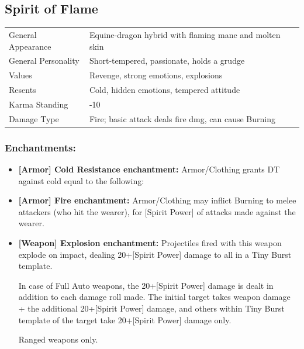 \documentclass[11pt,a4paper,twocolumn]{book}
\begin{document}
\subsection*{Spirit of Flame}
{
	\begin{tabu} to 75mm{| X[l,4] | X[l,8] |}
		\hline
		General Appearance		& Equine-dragon hybrid with flaming mane and molten skin		\\
        General Personality	   	& Short-tempered, passionate, holds a grudge					\\
        Values     				& Revenge, strong emotions, explosions							\\
        Resents     			& Cold, hidden emotions, tempered attitude						\\
        Karma Standing      	& -10															\\
        Damage Type 			& Fire; basic attack deals fire dmg, can cause Burning	 		\\ \hline
	\end{tabu}
		
}

\medskip

\subsubsection*{Enchantments:}

\begin{itemize}
\item \textbf{ [Armor] Cold Resistance enchantment:} Armor/Clothing grants DT against cold equal to the following:
\item \textbf{ [Armor] Fire enchantment:} Armor/Clothing may inflict Burning to melee attackers (who hit the wearer), for [Spirit Power] of attacks made against the wearer.
\item \textbf{ [Weapon] Explosion enchantment:} Projectiles fired with this weapon explode on impact, dealing 20+[Spirit Power] damage to all in a Tiny Burst template.

In case of Full Auto weapons, the 20+[Spirit Power] damage is dealt in addition to each damage roll made. The initial target takes weapon damage + the additional 20+[Spirit Power] damage, and others within Tiny Burst template of the target take 20+[Spirit Power] damage only.

Ranged weapons only.
\end{itemize}
\end{document}
